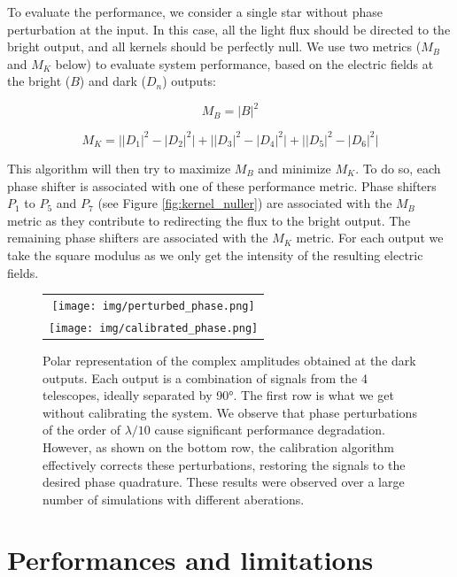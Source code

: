 \documentclass[]{spie}  %
\begin{document}
To evaluate the performance, we consider a single star without phase perturbation at the input. In this case, all the light flux should be directed to the bright output, and all kernels should be perfectly null. We use two metrics ($M_B$ and $M_K$ below) to evaluate system performance, based on the electric fields at the bright ($B$) and dark ($D_n$) outputs:

\begin{equation}
    M_B = |B|^2
\end{equation}

\begin{equation}
    M_K = \Big||D_1|^2 - |D_2|^2\Big|+\Big||D_3|^2 - |D_4|^2\Big|+\Big||D_5|^2 - |D_6|^2\Big|
\end{equation}

This algorithm will then try to maximize $M_B$ and minimize $M_K$. To do so, each phase shifter is associated with one of these performance metric. Phase shifters $P_1$ to $P_5$ and $P_7$ (see Figure \ref{fig:kernel_nuller}) are associated with the $M_B$ metric as they contribute to redirecting the flux to the bright output. The remaining phase shifters are associated with the $M_K$ metric. For each output we take the square modulus as we only get the intensity of the resulting electric fields.

\begin{figure} [H]
    \begin{center}
    \begin{tabular}{c}
    \texttt{[image: img/perturbed\_phase.png]}\\
    \texttt{[image: img/calibrated\_phase.png]}
    \end{tabular}
    \end{center}
    \caption[phases] 
    { \label{fig:phases} 
    Polar representation of the complex amplitudes obtained at the dark outputs. Each output is a combination of signals from the 4 telescopes, ideally separated by 90°. The first row is what we get without calibrating the system. We observe that phase perturbations of the order of $\lambda / 10$ cause significant performance degradation. However, as shown on the bottom row, the calibration algorithm effectively corrects these perturbations, restoring the signals to the desired phase quadrature. These results were observed over a large number of simulations with different aberations.}
\end{figure}

\section{Performances and limitations}
\end{document}
